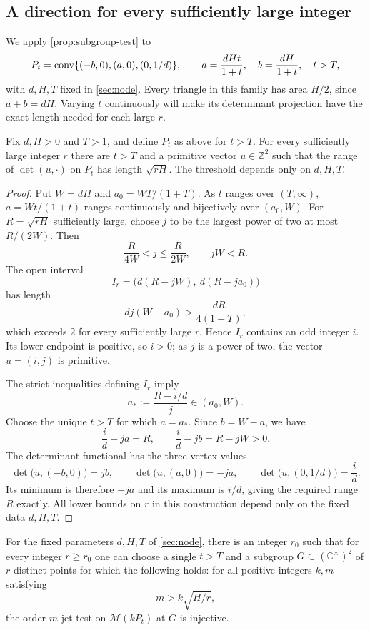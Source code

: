 \subsection{A direction for every sufficiently large integer}

We apply \cref{prop:subgroup-test} to
\[
 P_t=\operatorname{conv}\{(-b,0),(a,0),(0,1/d)\},
 \qquad
 a=\frac{dHt}{1+t},\quad b=\frac{dH}{1+t},\quad t>T,
\]
with $d,H,T$ fixed in \cref{sec:node}.  Every triangle in this family has area $H/2$, since $a+b=dH$.  Varying $t$ continuously will make its determinant projection have the exact length needed for each large $r$.

\begin{lemma}\label{lem:direction}
Fix $d,H>0$ and $T>1$, and define $P_t$ as above for $t>T$. For every sufficiently large integer $r$ there are $t>T$ and a primitive vector $u\in\mathbb{Z}^2$ such that the range of $\det(u,\cdot)$ on $P_t$ has length $\sqrt{rH}$.  The threshold depends only on $d,H,T$.
\end{lemma}

\begin{proof}
Put $W=dH$ and $a_0=WT/(1+T)$.  As $t$ ranges over $(T,\infty)$, $a=Wt/(1+t)$ ranges continuously and bijectively over $(a_0,W)$. For $R=\sqrt{rH}$ sufficiently large, choose $j$ to be the largest power of two at most $R/(2W)$.  Then
\[
 \frac{R}{4W}<j\leq\frac{R}{2W},
 \qquad jW<R.
\]
The open interval
\[
 I_r=\bigl(d(R-jW),\ d(R-ja_0)\bigr)
\]
has length
\[
 dj(W-a_0)>\frac{dR}{4(1+T)},
\]
which exceeds $2$ for every sufficiently large $r$.  Hence $I_r$ contains an odd integer $i$.  Its lower endpoint is positive, so $i>0$; as $j$ is a power of two, the vector $u=(i,j)$ is primitive.

The strict inequalities defining $I_r$ imply
\[
 a_*:=\frac{R-i/d}{j}\in(a_0,W).
\]
Choose the unique $t>T$ for which $a=a_*$.  Since $b=W-a$, we have
\[
 \frac{i}{d}+ja=R,
 \qquad
 \frac{i}{d}-jb=R-jW>0.
\]
The determinant functional has the three vertex values
\[
 \det\bigl(u,(-b,0)\bigr)=jb,
 \qquad
 \det\bigl(u,(a,0)\bigr)=-ja,
 \qquad
 \det\bigl(u,(0,1/d)\bigr)=\frac{i}{d}.
\]
Its minimum is therefore $-ja$ and its maximum is $i/d$, giving the required range $R$ exactly.  All lower bounds on $r$ in this construction depend only on the fixed data $d,H,T$.
\end{proof}

\begin{corollary}\label{cor:torus-test}
For the fixed parameters $d,H,T$ of \cref{sec:node}, there is an integer $r_0$ such that for every integer $r\geq r_0$ one can choose a single $t>T$ and a subgroup $G\subset(\mathbb{C}^\times)^2$ of $r$ distinct points for which the following holds: for all positive integers $k,m$ satisfying
\[
 m>k\sqrt{H/r},
\]
the order-$m$ jet test on $\mathcal{M}(kP_t)$ at $G$ is injective.
\end{corollary}

